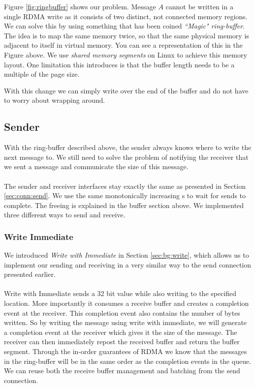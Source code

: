 Figure \ref{fig:ringbuffer} shows our problem. Message $A$ cannot be written in a single RDMA write as it consists of 
two distinct, not connected memory regions. We can solve this by using something that has been coined 
\emph{``Magic" ring-buffer}. The idea is to map the same memory twice, so that the same physical memory is adjacent to itself
in virtual memory. You can see a representation of this in the Figure above. We use \emph{shared memory segments} on 
Linux to achieve this memory layout. One limitation this introduces is that the buffer length needs to be a multiple of the
page size.

With this change we can simply write over the end of the buffer and do not have to worry about wrapping around.




\subsection{Sender} \label{sec:conn:write:sender}

With the ring-buffer described above, the sender always knows where to write the next message to. We still need to solve
the problem of notifying the receiver that we sent a message and communicate the size of this message.

\paragraph{}The sender and receiver interfaces stay exactly the same as presented in Section \ref{sec:conn:send}. We use the same 
monotonically increasing s to wait for sends to complete. The freeing is explained in the buffer section
above. We implemented three different ways to send and receive.


\subsubsection{Write Immediate}

We introduced \emph{Write with Immediate} in Section \ref{sec:bg:write}, which  allows us to implement our sending 
and receiving in a very similar way to the send connection presented earlier.

\paragraph{} Write with Immediate sends a 32 bit value while also writing to the specified location. More importantly it 
consumes a receive buffer and creates a completion event at the receiver. This completion event also contains the number 
of bytes written. So by writing the message using write with immediate, we will generate a completion event at the receiver
which gives it the size of the message. The receiver can then immediately repost the received buffer and return the buffer
segment. Through the in-order guarantees of RDMA we know that the messages in the ring-buffer will be in the same
order as the completion events in the queue. We can reuse both the receive buffer management and batching from the send 
connection.

